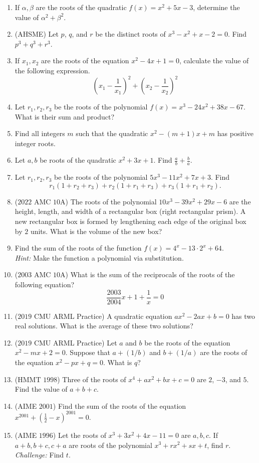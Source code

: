 \documentclass{tufte-handout}
\begin{document}
\begin{enumerate}
    \item If $\alpha, \beta$ are the roots of the quadratic $f(x)=x^2+5x-3$, determine the value of $\alpha^2+\beta^2$.
    \item (AHSME) Let $p$, $q$, and $r$ be the distinct roots of $x^3 - x^2 + x - 2 = 0$. Find $p^3 + q^3 + r^3$.
    \item If $x_1, x_2$ are the roots of the equation $x^2-4x+1=0$, calculate the value of the following expression.
    \[\left(x_1-\dfrac1{x_1}\right)^2+\left(x_2-\dfrac1{x_2}\right)^2\]
    \item Let $r_1,r_2,r_3$ be the roots of the polynomial $f(x)=x^3-24x^2+38x-67$. What is their sum and product?
    \item Find all integers \(m\) such that the quadratic $x^2-(m+1)x+m$ has positive integer roots.
    \item Let $a,b$ be roots of the quadratic $x^2+3x+1$. Find $\frac ab + \frac ba$.
    \item Let $r_1,r_2,r_3$ be the roots of the polynomial $5x^3-11x^2+7x+3$. Find
    \[r_1(1+r_2+r_3)+r_2(1+r_1+r_3)+r_3(1+r_1+r_2).\]
    \item ($2022$ AMC $10$A) The roots of the polynomial $10x^3 - 39x^2 + 29x - 6$ are the height, length, and width of a rectangular box (right rectangular prism). A new rectangular box is formed by lengthening each edge of the original box by $2$ units. What is the volume of the new box?
    \item Find the sum of the roots of the function $f(x)=4^x-13\cdot 2^x+64$. \\
    \textit{Hint: } Make the function a polynomial via substitution.
    \item ($2003$ AMC $10$A) What is the sum of the reciprocals of the roots of the following equation? 
    \[\frac{2003}{2004}x+1+\frac{1}{x}=0\]
    \item ($2019$ CMU ARML Practice) A quadratic equation $ax^2 - 2ax + b = 0$ has two real solutions. What is the average of these two solutions?
    \item ($2019$ CMU ARML Practice) Let $a$ and $b$ be the roots of the equation $x^2 - mx + 2 = 0$. Suppose that $a + (1/b)$ and $b + (1/a)$ are the roots of the equation $x^2 - px + q = 0$. What is $q$?
    \item  (HMMT $1998$) Three of the roots of $x^4 + ax^2 + bx + c = 0$ are $2$, $-3$, and $5$. Find the value of $a + b + c$.
    \item (AIME $2001$) Find the sum of the roots of the equation $x^{2001}+(\frac12-x)^{2001}=0$.
    \item (AIME $1996$) Let the roots of $x^3+3x^2+4x-11=0$ are $a,b,c$. If $a+b,b+c,c+a$ are roots of the polynomial $x^3+rx^2+sx+t$, find $r$. \\\textit{Challenge: } Find $t$.
    
    
\end{enumerate}
\end{document}
